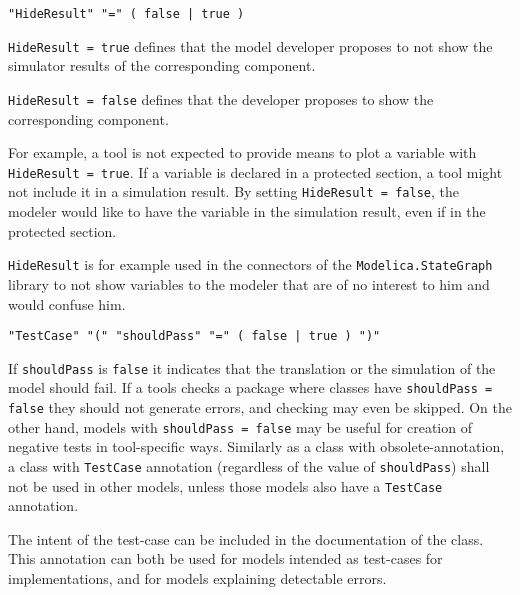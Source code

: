 \begin{annotationdefinition}[HideResult]
\begin{synopsis}[grammar]\begin{lstlisting}
"HideResult" "=" ( false | true )
\end{lstlisting}\end{synopsis}
\begin{semantics}
\lstinline!HideResult = true! defines that the model developer proposes to not show the simulator results of the corresponding component.

\lstinline!HideResult = false! defines that the developer proposes to show the corresponding component.

\begin{nonnormative}
For example, a tool is not expected to provide means to plot a variable with \lstinline!HideResult = true!.  If a variable is declared in a protected section, a tool might not include it in a simulation result. By setting \lstinline!HideResult = false!, the modeler would like to have the variable in the simulation result, even if in the protected section.

\lstinline!HideResult! is for example used in the connectors of the \lstinline!Modelica.StateGraph! library to not show variables to the modeler that are of no interest to him and would confuse him.
\end{nonnormative}
\end{semantics}
\end{annotationdefinition}

\begin{annotationdefinition}[TestCase]
\begin{synopsis}[grammar]\begin{lstlisting}
"TestCase" "(" "shouldPass" "=" ( false | true ) ")"
\end{lstlisting}\end{synopsis}
\begin{semantics}
If \lstinline!shouldPass! is \lstinline!false! it indicates that the translation or the simulation of the model should fail.
If a tools checks a package where classes have \lstinline!shouldPass = false! they should not generate errors, and checking may even be skipped.
On the other hand, models with \lstinline!shouldPass = false! may be useful for creation of negative tests in tool-specific ways.
Similarly as a class with obsolete-annotation, a class with \lstinline!TestCase! annotation (regardless of the value of \lstinline!shouldPass!) shall not be used in other models, unless those models also have a \lstinline!TestCase! annotation.

\begin{nonnormative}
The intent of the test-case can be included in the documentation of the class.
This annotation can both be used for models intended as test-cases for implementations, and for models explaining detectable errors.
\end{nonnormative}
\end{semantics}
\end{annotationdefinition}


